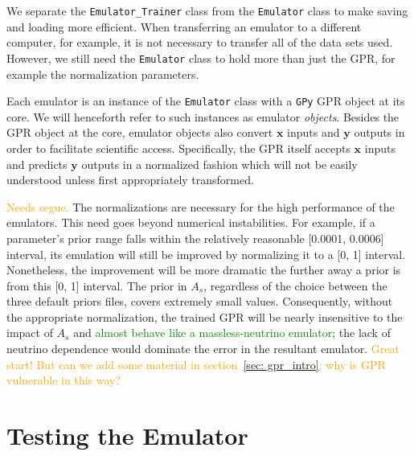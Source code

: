 We separate the \verb|Emulator_Trainer| class from the \verb|Emulator| class
to make saving and loading more efficient. When transferring an emulator to a
different computer, for example, it is not necessary to transfer all of the
data sets used.
However, we still need the \verb|Emulator| class to hold more than just the 
GPR, for example the normalization parameters.

Each emulator is an instance of
the \verb|Emulator| class with a \verb|GPy| GPR object at its core. We will 
henceforth refer to such instances as emulator \textit{objects}. Besides the 
GPR object at the core, emulator objects also convert $\bm{x}$ inputs and
$\bm{y}$ outputs in order to facilitate scientific access. Specifically, 
the GPR itself accepts $\bm{x}$ inputs and predicts $\bm{y}$ outputs 
in a normalized fashion which will not be easily understood unless first 
appropriately transformed.


\textcolor{orange}{Needs segue.}
The normalizations are necessary for the high performance of the emulators. 
This need goes beyond numerical instabilities. For example, if a parameter's 
prior range falls within the relatively reasonable [0.0001, 0.0006] interval, 
its emulation will still be improved by normalizing it to a [0, 1] interval. 
Nonetheless, the improvement will be more dramatic the further away a prior is 
from this [0, 1] interval. The prior in $A_s$, regardless of the choice
between the three default priors files, covers extremely small values. Consequently, 
without the appropriate normalization, the trained GPR will be nearly 
insensitive to the impact of $A_s$ and \textcolor{green}{almost behave like a 
massless-neutrino emulator}; the lack of neutrino dependence would dominate 
the error in the resultant emulator.
\textcolor{orange}{Great start! But can we add some material in
section~\ref{sec: gpr_intro}: why is GPR vulnerable in this way?}


\section{Testing the Emulator}
\label{test_emu}

